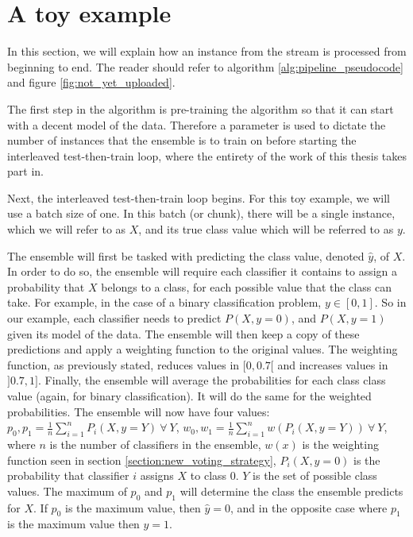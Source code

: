 
\section{A toy example}

In this section, we will explain how an instance from the stream is processed from beginning to end. The reader should refer to algorithm \ref{alg:pipeline_pseudocode} and figure \ref{fig:not_yet_uploaded}.

The first step in the algorithm is pre-training the algorithm so that it can start with a decent model of the data. Therefore a parameter is used to dictate the number of instances that the ensemble is to train on before starting the interleaved test-then-train loop, where the entirety of the work of this thesis takes part in.

Next, the interleaved test-then-train loop begins. For this toy example, we will use a batch size of one. In this batch (or chunk), there will be a single instance, which we will refer to as $X$, and its true class value which will be referred to as $y$.

The ensemble will first be tasked with predicting the class value, denoted $\hat{y}$, of $X$. In order to do so, the ensemble will require each classifier it contains to assign a probability that $X$ belongs to a class, for each possible value that the class can take. For example, in the case of a binary classification problem, $y \in [0,1]$. So in our example, each classifier needs to predict $P(X, y=0)$, and $P(X, y=1)$ given its model of the data. The ensemble will then keep a copy of these predictions and apply a weighting function to the original values. The weighting function, as previously stated, reduces values in $[0,0.7[$ and increases values in $]0.7, 1]$. Finally, the ensemble will average the probabilities for each class class value (again, for binary classification). It will do the same for the weighted probabilities. The ensemble will now have four values: $p_0, p_1 = \frac{1}{n}\sum_{i=1}^{n} P_i(X, y=Y)\ \forall\ Y$,  $w_0,w_1=\frac{1}{n}\sum_{i=1}^{n} w(P_i(X, y=Y))\ \forall\ Y$, where $n$ is the number of classifiers in the ensemble, $w(x)$ is the weighting function seen in section \ref{section:new_voting_strategy}, $P_i(X, y=0)$ is the probability that classifier $i$ assigns $X$ to class $0$. $Y$ is the set of possible class values.
The maximum of $p_0$ and $p_1$ will determine the class the ensemble predicts for $X$. If $p_0$ is the maximum value, then $\hat{y}=0$, and in the opposite case where $p_1$ is the maximum value then $\hat{y}=1$.

